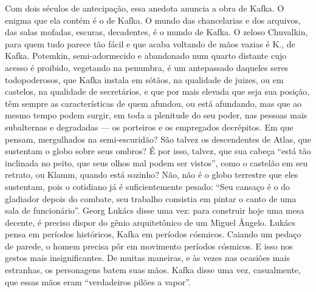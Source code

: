 Com dois séculos de antecipação, essa anedota anuncia a obra de Kafka. O
enigma que ela contém é o de Kafka. O mundo das chancelarias e dos
arquivos, das salas mofadas, escuras, decadentes, é o mundo de Kafka. O
zeloso Chuvalkin, para quem tudo parece tão fácil e que acaba voltando
de mãos vazias é K., de Kafka. Potemkin, semi-adormecido e abandonado
num quarto distante cujo acesso é proibido, vegetando na penumbra, é um
antepassado daqueles seres todopoderosos, que Kafka instala em sótãos,
na qualidade de juizes, ou em castelos, na qualidade de secretários, e
que por mais elevada que seja sua posição, têm sempre as características
de quem afundou, ou está afundando, mas que ao mesmo tempo podem surgir,
em toda a plenitude do seu poder, nas pessoas mais subalternas e
degradadas --- os porteiros e os empregados decrépitos. Em que pensam,
mergulhados na semi-escuridão? São talvez os descendentes de Atlas, que
sustentam o globo sobre seus ombros? É por isso, talvez, que sua cabeça
``está tão inclinada no peito, que seus olhos mal podem ser vistos'',
como o castelão em seu retrato, ou Klamm, quando está sozinho? Não, não
é o globo terrestre que eles sustentam, pois o cotidiano já é
suficientemente pesado: ``Seu cansaço é o do gladiador depois do
combate, seu trabalho consistia em pintar o canto de uma sala de
funcionário''. Georg Lukács disse uma vez: para construir hoje uma mesa
decente, é preciso dispor do gênio arquitetônico de um Miguel Ângelo.
Lukács pensa em períodos históricos, Kafka em períodos cósmicos. Caiando
um pedaço de parede, o homem precisa pôr em movimento períodos cósmicos.
E isso nos gestos mais insignificantes. De muitas maneiras, e às vezes
nas ocasiões mais estranhas, os personagens batem suas mãos. Kafka disse
uma vez, casualmente, que essas mãos eram ``verdadeiros pilões a
vapor''.

